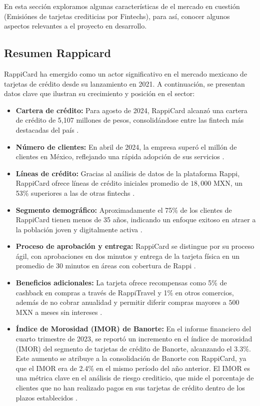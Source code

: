 En esta sección exploramos algunas características de el mercado en cuestión (Emisiónes de tarjetas crediticias por Fintechs), para así, conocer algunos aspectos relevantes a el proyecto en desarrollo.

\subsection*{Resumen Rappicard}
RappiCard ha emergido como un actor significativo en el mercado mexicano de tarjetas de crédito desde su lanzamiento en 2021. A continuación, se presentan datos clave que ilustran su crecimiento y posición en el sector:

\begin{itemize}
    \item \textbf{Cartera de crédito:} Para agosto de 2024, RappiCard alcanzó una cartera de crédito de 5,107 millones de pesos, consolidándose entre las fintech más destacadas del país \cite{forbes_cartera_2024}.
    \item \textbf{Número de clientes:} En abril de 2024, la empresa superó el millón de clientes en México, reflejando una rápida adopción de sus servicios \cite{expansion_millon_2024}.
    \item \textbf{Líneas de crédito:} Gracias al análisis de datos de la plataforma Rappi, RappiCard ofrece líneas de crédito iniciales promedio de $18,000$ MXN, un 53\% superiores a las de otras fintechs \cite{chocale_millon_2024}.
    \item \textbf{Segmento demográfico:} Aproximadamente el 75\% de los clientes de RappiCard tienen menos de 35 años, indicando un enfoque exitoso en atraer a la población joven y digitalmente activa \cite{expansion_millon_2024}.
    \item \textbf{Proceso de aprobación y entrega:} RappiCard se distingue por su proceso ágil, con aprobaciones en dos minutos y entrega de la tarjeta física en un promedio de 30 minutos en áreas con cobertura de Rappi \cite{forbes_cartera_2024}.
    \item \textbf{Beneficios adicionales:} La tarjeta ofrece recompensas como 5\% de cashback en compras a través de RappiTravel y 1\% en otros comercios, además de no cobrar anualidad y permitir diferir compras mayores a $500$ MXN a meses sin intereses \cite{chocale_millon_2024}.
    \item \textbf{Índice de Morosidad (IMOR) de Banorte:} En el informe financiero del cuarto trimestre de 2023, se reportó un incremento en el índice de morosidad (IMOR) del segmento de tarjetas de crédito de Banorte, alcanzando el 3.3\%. Este aumento se atribuye a la consolidación de Banorte con RappiCard, ya que el IMOR era de 2.4\% en el mismo período del año anterior. El IMOR es una métrica clave en el análisis de riesgo crediticio, que mide el porcentaje de clientes que no han realizado pagos en sus tarjetas de crédito dentro de los plazos establecidos \cite{fintechexpertrappicardmorosidad}.

\end{itemize}
